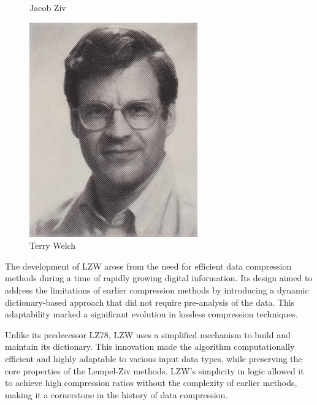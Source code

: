 \begin{figure}[ht]
\begin{minipage}{0.3\textwidth}
        \captionsetup{font=small}
        \caption{Jacob Ziv}
        \label{fig:fig2}
    \end{minipage}%
    \hfill
    \begin{minipage}{0.3\textwidth}
        \centering
        \includegraphics[width=\linewidth, height=1.1\textwidth]{Figures/welch.jpg}
        \captionsetup{font=small}
        \caption{Terry Welch}
        \label{fig:fig3}
    \end{minipage}
\end{figure}


The development of LZW arose from the need for efficient data compression methods during a time of rapidly growing digital information. Its design aimed to address the limitations of earlier compression methods by introducing a dynamic dictionary-based approach that did not require pre-analysis of the data. This adaptability marked a significant evolution in lossless compression techniques.

\vspace{10pt}

Unlike its predecessor LZ78, LZW uses a simplified mechanism to build and maintain its dictionary. This innovation made the algorithm computationally efficient and highly adaptable to various input data types, while preserving the core properties of the Lempel-Ziv methods. LZW's simplicity in logic allowed it to achieve high compression ratios without the complexity of earlier methods, making it a cornerstone in the history of data compression.